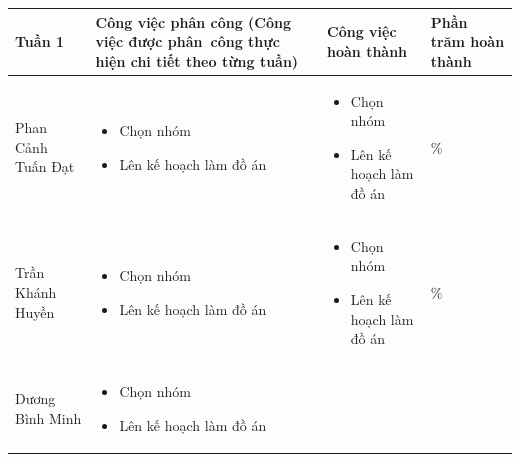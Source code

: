 \documentclass[a4paper,12pt]{report}
\begin{document}
\noindent
\begin{center}
    \begin{longtable}{|>{\centering\arraybackslash}p{3cm}|
        >{\centering\arraybackslash}p{5.5cm}|
        >{\centering\arraybackslash}p{5.5cm}|
        >{\centering\arraybackslash}p{1.5cm}|}
        \hline
        \textbf{Tuần 1}               &
        \textbf{Công việc phân công \newline
            (Công việc được phân~công thực hiện chi tiết theo từng tuần)
        }                             &
        \textbf{Công việc hoàn thành} &
        \textbf{Phần trăm hoàn thành}         \\
        \hline
        Phan Cảnh Tuấn Đạt            &
        \begin{itemize}
            \item Chọn nhóm
            \item Lên kế hoạch làm đồ án
        \end{itemize}  &
        \begin{itemize}
            \item Chọn nhóm
            \item Lên kế hoạch làm đồ án
        \end{itemize}
                                      & 100\% \\
        \hline
        Trần Khánh Huyền              &
        \begin{itemize}
            \item Chọn nhóm
            \item Lên kế hoạch làm đồ án
        \end{itemize}  &
        \begin{itemize}
            \item Chọn nhóm
            \item Lên kế hoạch làm đồ án
        \end{itemize}
                                      & 100\% \\
        \hline
        Dương Bình Minh               &
        \begin{itemize}
            \item Chọn nhóm
            \item Lên kế hoạch làm đồ án
        \end{itemize}
                                      &
        \begin{itemize}

\end{itemize}
\end{longtable}
\end{center}
\end{document}

